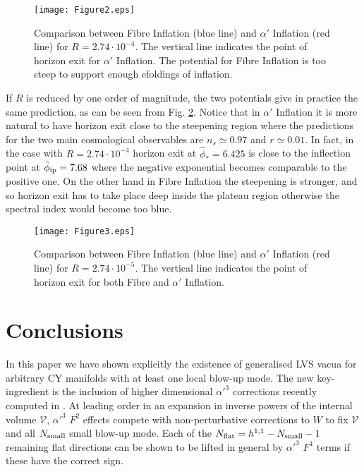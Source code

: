 \documentclass[11pt,a4paper]{article}
\newcommand\vo{{\mathcal{V}}}
\begin{document}
\begin{figure}[h!]
\begin{center}
\texttt{[image: Figure2.eps]}
\caption{Comparison between Fibre Inflation (blue line) and $\alpha'$ Inflation (red line) for $R=2.74\cdot 10^{-4}$. The vertical line indicates the point of horizon exit for $\alpha'$ Inflation. The potential for Fibre Inflation is too steep to support enough efoldings of inflation.} 
\label{Fig2}
\end{center}
\end{figure}

If $R$ is reduced by one order of magnitude, the two potentials give in practice the same prediction, as can be seen from Fig. \ref{Fig3}. Notice that in $\alpha'$ Inflation it is more natural to have horizon exit close to the steepening region where the predictions for the two main cosmological observables are $n_s\simeq 0.97$ and $r\simeq 0.01$. In fact, in the case with $R=2.74\cdot 10^{-4}$ horizon exit at $\hat\phi_* =6.425$ is close to the inflection point at $\hat\phi_{\rm ip}=7.68$ where the negative exponential becomes comparable to the positive one. On the other hand in Fibre Inflation the steepening is stronger, and so horizon exit has to take place deep inside the plateau region otherwise the spectral index would become too blue.

\begin{figure}[h!]
\begin{center}
\texttt{[image: Figure3.eps]}
\caption{Comparison between Fibre Inflation (blue line) and $\alpha'$ Inflation (red line) for $R=2.74\cdot 10^{-5}$. The vertical line indicates the point of horizon exit for both Fibre and $\alpha'$ Inflation.} 
\label{Fig3}
\end{center}
\end{figure}





\section{Conclusions}
\label{Concl}

In this paper we have shown explicitly the existence of generalised LVS vacua for arbitrary CY manifolds with at least one local blow-up mode. The new key-ingredient is the inclusion of higher dimensional $\alpha'^3$ corrections recently computed in \cite{Ciupke:2015msa}. At leading order in an expansion in inverse powers of the internal volume $\vo$, $\alpha'^3$ $F^2$ effects compete with non-perturbative corrections to $W$ to fix $\vo$ and all $N_{\rm small}$ small blow-up mode. Each of the $N_{\rm flat} = h^{1,1} - N_{\rm small}-1$ remaining flat directions can be shown to be lifted in general by $\alpha'^3$ $F^4$ terms if these have the correct sign. 
\end{document}
